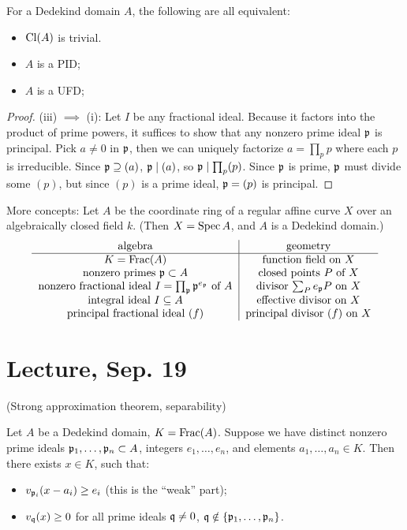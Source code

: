 \documentclass[11pt]{amsart}
\begin{document}
\begin{thm}
For a Dedekind domain $A$, the following are all equivalent:
\begin{itemize}
    \item $\operatorname{Cl}(A)$ is trivial.
    \item $A$ is a PID;
    \item $A$ is a UFD;
\end{itemize}
\end{thm}

\begin{proof}
(iii) $\implies$ (i): Let $I$ be any fractional ideal. Because it factors into the product of prime powers, it suffices to show that any nonzero prime ideal $\mathfrak{p}$ is principal. Pick $a\neq 0$ in $\mathfrak{p}$, then we can uniquely factorize $a = \prod_p p$ where each $p$ is irreducible. Since $\mathfrak{p}\supseteq (a)$, $\mathfrak{p} \mid (a)$, so $\mathfrak{p} \mid \prod_p(p)$. Since $\mathfrak{p}$ is prime, $\mathfrak{p}$ must divide some $(p)$, but since $(p)$ is a prime ideal, $\mathfrak{p} = (p)$ is principal.
\end{proof}

More concepts: Let $A$ be the coordinate ring of a regular affine curve $X$ over an algebraically closed field $k$. (Then $X = \operatorname{Spec} A$, and $A$ is a Dedekind domain.)
\[
\begin{tabular}{c|c}
algebra & geometry \\
\hline
$K = \Frac(A)$ & function field on $X$ \\
nonzero primes $\fp\subset A$ & closed points $P$ of $X$ \\
nonzero fractional ideal $I = \prod_{\fp}\fp^{e_{\fp}}$ of $A$ & divisor $\sum_{P} e_{\fp} P$ on $X$ \\
integral ideal $I\subseteq A$ & effective divisor on $X$ \\
principal fractional ideal $(f)$ & principal divisor $(f)$ on $X$
\end{tabular}
\]


\section{Lecture, Sep. 19}

(Strong approximation theorem, separability)

\begin{thm}
Let $A$ be a Dedekind domain, $K = \operatorname{Frac}(A)$. Suppose we have distinct nonzero prime ideals $\mathfrak{p}_1,\dots,\mathfrak{p}_n \subset A$, integers $e_1,\dots,e_n$, and elements $a_1,\dots,a_n\in K$. Then there exists $x\in K$, such that:
\begin{itemize}
    \item $v_{\mathfrak{p}_i}(x - a_i) \ge e_i$ (this is the ``weak'' part);
    \item $v_{\mathfrak{q}}(x) \ge 0$ for all prime ideals $\mathfrak{q}\neq 0$, $\mathfrak{q} \notin \{\mathfrak{p}_1,\dots,\mathfrak{p}_n\}$.
\end{itemize}
\end{thm}
\end{document}
